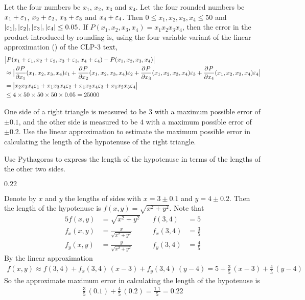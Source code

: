 \begin{solution}
Let the four numbers be $x_1$, $x_2$, $x_3$ and $x_4$.
Let the four rounded numbers be $x_1+\varepsilon_1$, $x_2+\varepsilon_2$, $x_3+\varepsilon_3$ 
and $x_4+\varepsilon_4$. Then $0\le x_1,x_2,x_3,x_4\le 50$ and 
$|\varepsilon_1|,|\varepsilon_2|,|\varepsilon_3|,|\varepsilon_4|\le 0.05$. If 
$P(x_1,x_2,x_3,x_4)=x_1x_2x_3x_4$, then the error in the product 
introduced by rounding is, using the four variable variant of the 
linear approximation () of the CLP-3 text,
\begin{align*}
&\big|P(x_1+\veps_1,x_2+\veps_2,x_3+\veps_3,x_4+\veps_4)-P(x_1,x_2,x_3,x_4)\big|
\\
&\approx\big|\pdiff{P}{x_1}(x_1,x_2,x_3,x_4)\veps_1
+\pdiff{P}{x_2}(x_1,x_2,x_3,x_4)\veps_2
+\pdiff{P}{x_3}(x_1,x_2,x_3,x_4)\veps_3
+\pdiff{P}{x_4}(x_1,x_2,x_3,x_4)\veps_4\big|\\
&=\big|x_2x_3x_4\veps_1
+x_1x_3x_4\veps_2
+x_1x_2x_4\veps_3
+x_1x_2x_3\veps_4\big|\\
&\le 4\times 50\times 50\times 50\times 0.05
=25000
\end{align*}
\end{solution}

\begin{question}[M200 2005D] %
One side of a right triangle is measured to be $3$ with a maximum 
possible error of $\pm 0.1$, and the other side is measured to be 
$4$ with a maximum possible error of $\pm 0.2$.
Use the linear approximation to estimate the maximum possible error
in calculating the length of the hypotenuse of the right triangle.
\end{question}

\begin{hint}
Use Pythagoras to express the length of the hypotenuse
in terms of the lengths of the other two sides.
\end{hint}

\begin{answer}
$0.22$
\end{answer}

\begin{solution}
Denote by $x$ and $y$ the lengths of sides with $x=3\pm 0.1$
and $y=4\pm 0.2$. Then the length of the hypotenuse is 
$f(x,y)=\sqrt{x^2+y^2}$. Note that
\begin{alignat*}{5}
f(x,y)&=\sqrt{x^2+y^2} &
         f(3,4)&=5 \\
f_x(x,y)&=\frac{x}{\sqrt{x^2+y^2}}\qquad &
         f_x(3,4)&=\frac{3}{5} \\
f_y(x,y)&=\frac{y}{\sqrt{x^2+y^2}} &
         f_y(3,4)&=\frac{4}{5} 
\end{alignat*}
By the linear approximation
\begin{align*}
f(x,y)\approx f(3,4) + f_x(3,4)\,(x-3) + f_y(3,4)\,(y-4)
      =5 +\frac{3}{5}\,(x-3)  +\frac{4}{5}\,(y-4)
\end{align*}
So the approximate maximum error in calculating the length of the hypotenuse
is
\begin{align*}
\frac{3}{5}\,(0.1)  +\frac{4}{5}\,(0.2)
=\frac{1.1}{5} = 0.22
\end{align*}

\end{solution}


